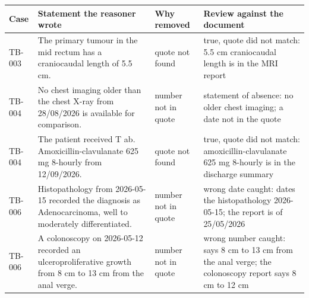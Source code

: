 \begin{tabular}{@{}l>{\raggedright\arraybackslash}p{7.2cm}l>{\raggedright\arraybackslash}p{4.2cm}@{}}
\toprule
Case & Statement the reasoner wrote & Why removed & Review against the document \\
\midrule
TB-003 & The primary tumour in the mid rectum has a craniocaudal length of 5.5 cm. & quote not found & true, quote did not match: 5.5 cm craniocaudal length is in the MRI report \\
TB-004 & No chest imaging older than the chest X-ray from 28/08/2026 is available for comparison. & number not in quote & statement of absence: no older chest imaging; a date not in the quote \\
TB-004 & The patient received T ab. Amoxicillin-clavulanate 625 mg 8-hourly from 12/09/2026. & quote not found & true, quote did not match: amoxicillin-clavulanate 625 mg 8-hourly is in the discharge summary \\
TB-006 & Histopathology from 2026-05-15 recorded the diagnosis as Adenocarcinoma, well to moderately differentiated. & number not in quote & wrong date caught: dates the histopathology 2026-05-15; the report is of 25/05/2026 \\
TB-006 & A colonoscopy on 2026-05-12 recorded an ulceroproliferative growth from 8 cm to 13 cm from the anal verge. & number not in quote & wrong number caught: says 8 cm to 13 cm from the anal verge; the colonoscopy report says 8 cm to 12 cm \\
\bottomrule
\end{tabular}
